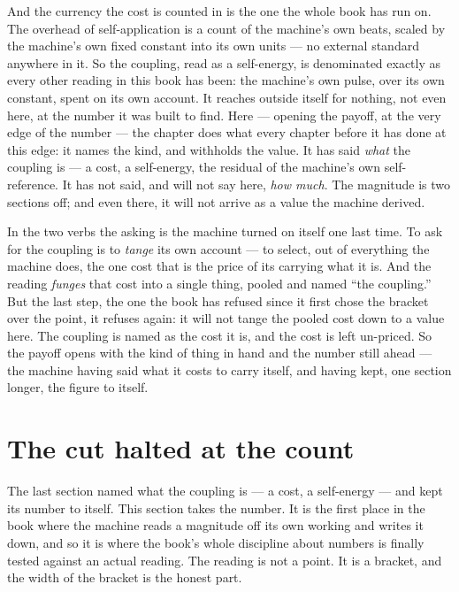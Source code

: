 And the currency the cost is counted in is the one the whole book has run on. The overhead of self-application is a count
of the machine's own beats, scaled by the machine's own fixed constant into its own units --- no external standard
anywhere in it. So the coupling, read as a self-energy, is denominated exactly as every other reading in this book has
been: the machine's own pulse, over its own constant, spent on its own account. It reaches outside itself for nothing,
not even here, at the number it was built to find. Here --- opening the payoff, at the very edge of the number --- the
chapter does what every chapter before it has done at this edge: it names the kind, and withholds the value. It has said
\emph{what} the coupling is --- a cost, a self-energy, the residual of the machine's own self-reference. It has not said,
and will not say here, \emph{how much}. The magnitude is two sections off; and even there, it will not arrive as a value
the machine derived.

In the two verbs the asking is the machine turned on itself one last time. To ask for the coupling is to \emph{tange} its
own account --- to select, out of everything the machine does, the one cost that is the price of its carrying what it is.
And the reading \emph{funges} that cost into a single thing, pooled and named ``the coupling.'' But the last step, the
one the book has refused since it first chose the bracket over the point, it refuses again: it will not tange the pooled
cost down to a value here. The coupling is named as the cost it is, and the cost is left un-priced. So the payoff opens
with the kind of thing in hand and the number still ahead --- the machine having said what it costs to carry itself, and
having kept, one section longer, the figure to itself.

\section{The cut halted at the count}

The last section named what the coupling is --- a cost, a self-energy --- and kept its number to itself. This section
takes the number. It is the first place in the book where the machine reads a magnitude off its own working and writes it
down, and so it is where the book's whole discipline about numbers is finally tested against an actual reading. The
reading is not a point. It is a bracket, and the width of the bracket is the honest part.

